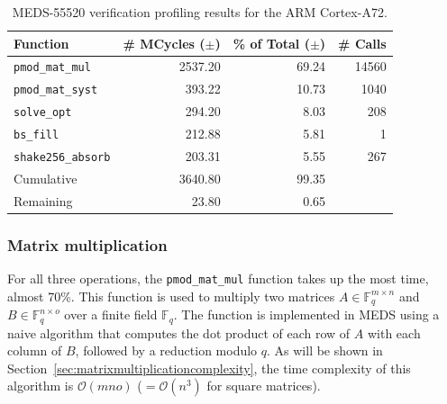 \documentclass[11pt,a4paper]{report}
\theoremstyle{definition}
\begin{document}
\begin{table}
  \centering
  \caption{MEDS-55520 verification profiling results for the ARM Cortex-A72.}
  \begin{tabular}{lrrr}
    \toprule
    \textbf{Function}         & \textbf{\# MCycles} ($\pm$) & \textbf{\% of Total} ($\pm$) & \textbf{\# Calls} \\
    \midrule
    \texttt{pmod\_mat\_mul}   & 2537.20                     & 69.24                        & 14560             \\
    \texttt{pmod\_mat\_syst}  & 393.22                      & 10.73                        & 1040              \\
    \texttt{solve\_opt}       & 294.20                      & 8.03                         & 208               \\
    \texttt{bs\_fill}         & 212.88                      & 5.81                         & 1                 \\
    \texttt{shake256\_absorb} & 203.31                      & 5.55                         & 267               \\
    \midrule
    Cumulative                & 3640.80                     & 99.35                        &                   \\
    Remaining                 & 23.80                       & 0.65                         &                   \\
    \bottomrule
  \end{tabular}
  \label{tab:medsverificationfunctions}
\end{table}

\subsubsection{Matrix multiplication}
For all three operations, the \texttt{pmod\_mat\_mul} function takes up the most time, almost 70\%. This function is used to multiply two matrices $A \in \mathbb{F}_q^{m \times n}$ and $B \in \mathbb{F}_q^{n \times o}$ over a finite field $\mathbb{F}_q$. The function is implemented in MEDS using a naive algorithm that computes the dot product of each row of $A$ with each column of $B$, followed by a reduction modulo $q$. As will be shown in Section~\ref{sec:matrixmultiplicationcomplexity}, the time complexity of this algorithm is $\mathcal{O}(mno)$ ($= \mathcal{O}(n^3)$ for square matrices).
\end{document}
